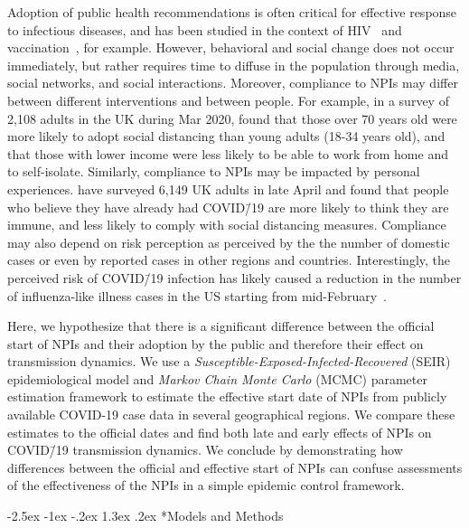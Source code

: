 \documentclass[12pt]{extarticle}
\makeatletter
\renewcommand\section{\@startsection {section}{1}{\z@}%
     {-2.5ex \@plus -1ex \@minus -.2ex}%
     {1.3ex \@plus.2ex}%
    {\Large\bfseries}}
\makeatother
\begin{document}
Adoption of public health recommendations is often critical for effective response to infectious diseases, and has been studied in the context of HIV~\citep{Kaufman2014} and vaccination~\citep{Dunn2015,Wiyeh2018}, for example.
However, behavioral and social change does not occur immediately, but rather requires time to diffuse in the population through media, social networks, and social interactions. 
Moreover, compliance to NPIs may differ between different interventions and between people.
For example, in a survey of 2,108 adults in the UK during Mar 2020, \citet{Atchison2020} found that those over 70 years old were more likely to adopt social distancing than young adults (18-34 years old), and that those with lower income were less likely to be able to work from home and to self-isolate.
Similarly, compliance to NPIs may be impacted by personal experiences. \citet{Smith2020} have surveyed 6,149 UK adults in late April and found that people who believe they have already had COVID\=/19 are more likely to think they are immune, and less likely to comply with social distancing measures. 
Compliance may also depend on risk perception as perceived by the the number of domestic cases or even by reported cases in other regions and countries.
Interestingly, the perceived risk of COVID\=/19 infection has likely caused a reduction in the number of influenza-like illness cases in the US starting from mid-February~\citep{Zipfel2020}.

Here, we hypothesize that there is a significant difference between the official start of NPIs and their adoption by the public and therefore their effect on transmission dynamics.
We use a \textit{Susceptible-Exposed-Infected-Recovered} (SEIR) epidemiological model and \textit{Markov Chain Monte Carlo} (MCMC) parameter estimation framework to estimate the effective start date of NPIs from publicly available COVID-19 case data in several geographical regions.
We compare these estimates to the official dates and find both late and early effects of NPIs on COVID\=/19 transmission dynamics.
We conclude by demonstrating how differences between the official and effective start of NPIs can confuse assessments of the effectiveness of the NPIs in a simple epidemic control framework. %



\section*{Models and Methods}
\end{document}
